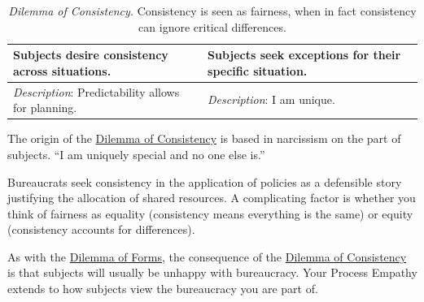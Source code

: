 

\begin{center}
\begin{table}[H] %
\begin{tabular}{ | m{\dilemmatablewidth}| m{\dilemmatablewidth} | } 
  \hline
  \textbf{Subjects desire consistency across situations.} &
  \textbf{Subjects seek exceptions for their specific situation.} \\
  \hline
  \textit{Description}: Predictability allows for planning. & 
  \textit{Description}: I am unique. \\
  \hline
\end{tabular}
\caption{\textit{Dilemma of Consistency.}
Consistency is seen as fairness, when in fact consistency can ignore critical differences. %
}
\label{table:dilemma-subject-consistency-per-situation}
\end{table}
\end{center}

The origin of the \hyperref[table:dilemma-subject-consistency-per-situation]{Dilemma of Consistency} is based in narcissism on the part of subjects. ``I am uniquely special and no one else is.''  

Bureaucrats seek consistency in the application of policies as a defensible story justifying the allocation of shared resources. A complicating factor is whether you think of fairness as equality (consistency means everything is the same) or equity (consistency accounts for differences). 

As with the \hyperref[table:dilemma-subject-forms]{Dilemma of Forms}, the consequence of the \hyperref[table:dilemma-subject-consistency-per-situation]{Dilemma of Consistency} is that subjects will usually be unhappy with bureaucracy. Your Process Empathy extends to how subjects view the bureaucracy you are part of.

